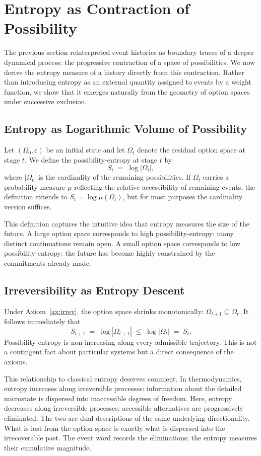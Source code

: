 \documentclass[12pt]{article}
\theoremstyle{plain}
\theoremstyle{definition}
\theoremstyle{remark}
\begin{document}
\section{Entropy as Contraction of Possibility}
\label{sec:entropy}

The previous section reinterpreted event histories as boundary traces of a
deeper dynamical process: the progressive contraction of a space of
possibilities.  We now derive the entropy measure of a history directly from
this contraction.  Rather than introducing entropy as an external quantity
assigned to events by a weight function, we show that it emerges naturally
from the geometry of option spaces under successive exclusion.

\subsection{Entropy as Logarithmic Volume of Possibility}

Let $(\Omega_0, \varepsilon)$ be an initial state and let $\Omega_t$ denote
the residual option space at stage $t$.  We define the possibility-entropy
at stage $t$ by
\[
  S_t \;=\; \log |\Omega_t|,
\]
where $|\Omega_t|$ is the cardinality of the remaining possibilities.  If
$\Omega_t$ carries a probability measure $\mu$ reflecting the relative
accessibility of remaining events, the definition extends to
$S_t = \log \mu(\Omega_t)$, but for most purposes the cardinality version
suffices.

This definition captures the intuitive idea that entropy measures the size of
the future.  A large option space corresponds to high possibility-entropy: many
distinct continuations remain open.  A small option space corresponds to low
possibility-entropy: the future has become highly constrained by the
commitments already made.

\subsection{Irreversibility as Entropy Descent}

Under Axiom~\ref{ax:irrev}, the option space shrinks monotonically:
$\Omega_{t+1} \subseteq \Omega_t$.  It follows immediately that
\[
  S_{t+1} \;=\; \log |\Omega_{t+1}| \;\leq\; \log |\Omega_t| \;=\; S_t.
\]
Possibility-entropy is non-increasing along every admissible trajectory.
This is not a contingent fact about particular systems but a direct consequence
of the axioms.

This relationship to classical entropy deserves comment.  In thermodynamics,
entropy increases along irreversible processes: information about the detailed
microstate is dispersed into inaccessible degrees of freedom.  Here, entropy
decreases along irreversible processes: accessible alternatives are progressively
eliminated.  The two are dual descriptions of the same underlying directionality.
What is lost from the option space is exactly what is dispersed into the
irrecoverable past.  The event word records the eliminations; the entropy
measures their cumulative magnitude.
\end{document}
